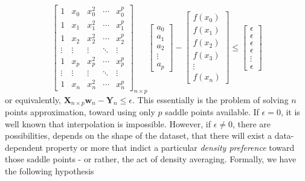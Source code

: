 \begin{equation}\label{eq:soft_hard_interpolation_role}
\begin{bmatrix}
1 & x_0 & x_0^2 & \cdots & x_0^p \\
1 & x_1 & x_1^2 & \cdots & x_1^p \\
1 & x_2 & x_2^2 & \cdots & x_2^p \\
\vdots & \vdots & \vdots & \ddots & \vdots \\
1 & x_p & x_p^2 & \cdots & x_p^p \\
\vdots & \vdots & \vdots & \ddots & \vdots \\
1 & x_n & x_n^2 & \cdots & x_n^p
\end{bmatrix}_{n\times p}
\begin{bmatrix}
a_0 \\
a_1 \\
a_2 \\
\vdots \\
a_p
\end{bmatrix}
- 
\begin{bmatrix}
f(x_0) \\
f(x_1) \\
f(x_2) \\
f(x_3) \\
\vdots \\
f(x_n)
\end{bmatrix}
\leq \begin{bmatrix}
  \epsilon\\
  \epsilon \\ 
  \epsilon \\
  \epsilon \\
  \vdots \\
  \epsilon
\end{bmatrix}
\end{equation}
or equivalently, $\mathbf{X}_{n\times p}\mathbf{w}_{n}-\mathbf{Y}_{n}\leq \epsilon$. This essentially is the problem of solving $n$ points approximation, toward using only $p$ saddle points available. If $\epsilon =0$, it is well known that interpolation is impossible. However, if $\epsilon\ne 0$, there are possibilities, depends on the shape of the dataset, that there will exist a data-dependent property or more that indict a particular \textit{density preference} toward those saddle points - or rather, the act of density averaging. Formally, we have the following hypothesis

